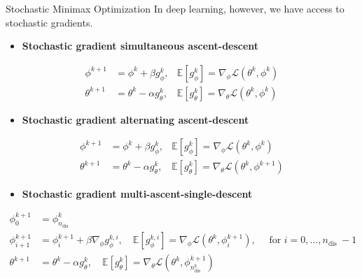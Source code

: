 \begin{frame}[allowframebreaks]

\begin{mydefinitionblock}{12.5}{Stochastic Minimax Optimization}
    In deep learning, however, we have access to stochastic gradients.

    \begin{itemize}
        \item \textbf{Stochastic gradient simultaneous ascent-descent}
    \end{itemize}

    $$
    \begin{aligned}
    \phi^{k+1} & =\phi^{k}+\beta g_{\phi}^{k}, & \mathbb{E}\left[g_{\phi}^{k}\right]=\nabla_{\phi} \mathcal{L}\left(\theta^{k}, \phi^{k}\right) \\
    \theta^{k+1} & =\theta^{k}-\alpha g_{\theta}^{k}, & \mathbb{E}\left[g_{\theta}^{k}\right]=\nabla_{\theta} \mathcal{L}\left(\theta^{k}, \phi^{k}\right)
    \end{aligned}
    $$

    \begin{itemize}
        \item \textbf{Stochastic gradient alternating ascent-descent}
    \end{itemize}

    $$
    \begin{aligned}
    \phi^{k+1} & =\phi^{k}+\beta g_{\phi}^{k}, & \mathbb{E}\left[g_{\phi}^{k}\right]=\nabla_{\phi} \mathcal{L}\left(\theta^{k}, \phi^{k}\right) \\
    \theta^{k+1} & =\theta^{k}-\alpha g_{\theta}^{k}, & \mathbb{E}\left[g_{\theta}^{k}\right]=\nabla_{\theta} \mathcal{L}\left(\theta^{k}, \phi^{k+1}\right)
    \end{aligned}
    $$

    \begin{itemize}
        \item \textbf{Stochastic gradient multi-ascent-single-descent}
    \end{itemize}

    $$
    \begin{aligned}
    \phi_{0}^{k+1} & =\phi_{n_{\text {dis }}}^{k} \\
    \phi_{i+1}^{k+1} & =\phi_{i}^{k+1}+\beta \nabla_{\phi} g_{\phi}^{k, i}, \quad \mathbb{E}\left[g_{\phi}^{k, i}\right]=\nabla_{\phi} \mathcal{L}\left(\theta^{k}, \phi_{i}^{k+1}\right), \quad \text { for } i=0, \ldots, n_{\text {dis }}-1 \\
    \theta^{k+1} & =\theta^{k}-\alpha g_{\theta}^{k}, \quad \mathbb{E}\left[g_{\theta}^{k}\right]=\nabla_{\theta} \mathcal{L}\left(\theta^{k}, \phi_{n_{\text {dis }}^{k}}^{k+1}\right)
    \end{aligned}
    $$
\end{mydefinitionblock}

\end{frame}

